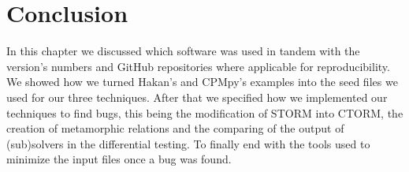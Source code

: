

\section{Conclusion}
\label{impl:conclusion}
In this chapter we discussed which software was used in tandem with the version's numbers and GitHub repositories where applicable for reproducibility. We showed how we turned Hakan's and CPMpy's examples into the seed files we used for our three techniques. After that we specified how we implemented our techniques to find bugs, this being the modification of STORM into CTORM, the creation of metamorphic relations and the comparing of the output of (sub)solvers in the differential testing. To finally end with the tools used to minimize the input files once a bug was found.


